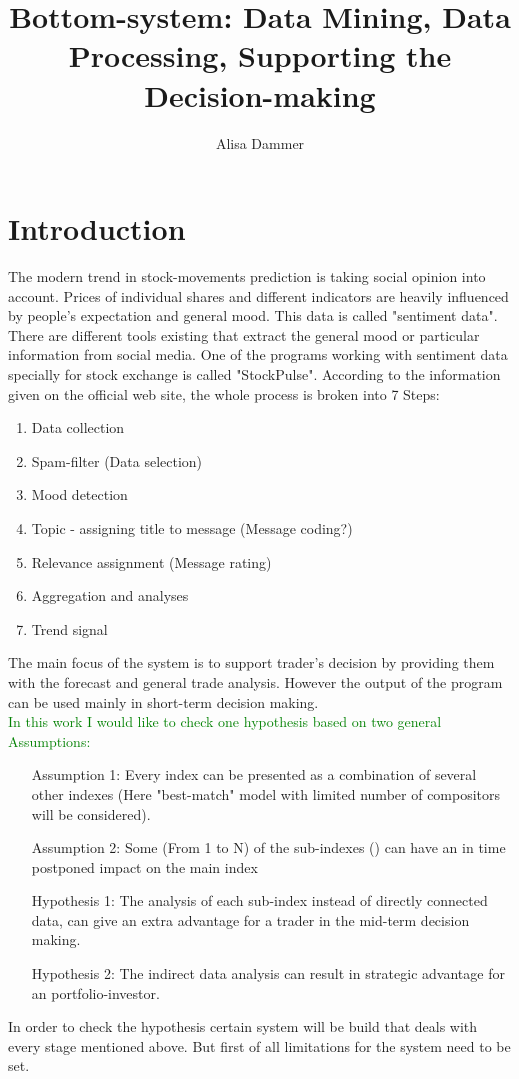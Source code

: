 \documentclass[11pt]{article}
\title{\textbf{Bottom-system: Data Mining, Data Processing, Supporting the Decision-making}}
\author{Alisa Dammer}
\begin{document}
\maketitle

\section{Introduction}
The modern trend in stock-movements prediction is taking social opinion into account. Prices of individual shares and different indicators are heavily influenced by people's expectation and general mood. This data is called "sentiment data". There are different tools existing that extract the general mood or particular information from social media.
One of the programs working with sentiment data specially for stock exchange is called "StockPulse". According to the information given on the official web site, the whole process is broken into 7 Steps:\\
\begin{enumerate}
	\item Data collection
	\item Spam-filter (Data selection)
	\item Mood detection
	\item Topic - assigning title to message (Message coding?)
	\item Relevance assignment (Message rating)
	\item Aggregation and analyses
	\item Trend signal
\end{enumerate}
The main focus of the system is to support trader's decision by providing them with the forecast and general trade analysis. However the output of the program can be used mainly in short-term decision making.\\
\textcolor{green}{In this work I would like to check one hypothesis based on two general Assumptions: }
\begin{enumerate}

	\item[Assumption 1:] Every index can be presented as a combination of several other indexes (Here "best-match" model with limited number of compositors will be considered).
	\item[Assumption 2:] Some (From 1 to N) of the sub-indexes () can have an in time postponed impact on the main index 
	\item[Hypothesis 1:] The analysis of each sub-index instead of directly connected data, can give an extra advantage for a trader in the mid-term decision making.
	\item[Hypothesis 2:] The indirect data analysis can result in strategic advantage for an portfolio-investor.
\end{enumerate}
In order to check the hypothesis certain system will be build that deals with every stage mentioned above. But first of all limitations for the system need to be set.\\
\end{document}
